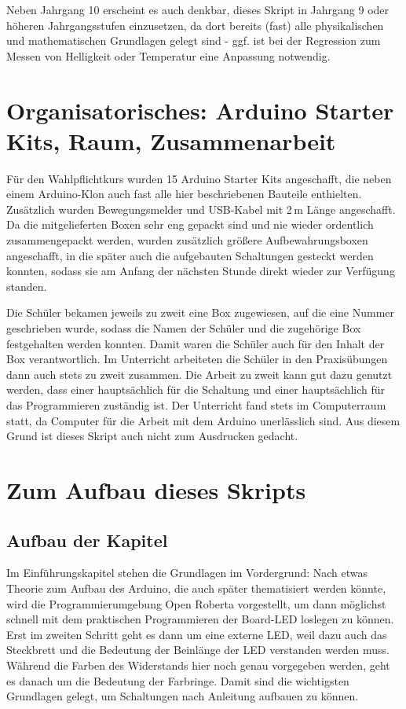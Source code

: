 Neben Jahrgang 10 erscheint es auch denkbar, dieses Skript in Jahrgang 9 oder höheren Jahrgangsstufen einzusetzen, da dort bereits (fast) alle physikalischen und mathematischen Grundlagen gelegt sind - ggf. ist bei der Regression zum Messen von Helligkeit oder Temperatur eine Anpassung notwendig.

\section{Organisatorisches: Arduino Starter Kits, Raum, Zusammenarbeit}

Für den Wahlpflichtkurs wurden 15 Arduino Starter Kits angeschafft, die neben einem Arduino-Klon auch fast alle hier beschriebenen Bauteile enthielten. Zusätzlich wurden Bewegungsmelder und USB-Kabel mit 2\,m Länge angeschafft. Da die mitgelieferten Boxen sehr eng gepackt sind und nie wieder ordentlich zusammengepackt werden, wurden zusätzlich größere Aufbewahrungsboxen angeschafft, in die später auch die aufgebauten Schaltungen gesteckt werden konnten, sodass sie am Anfang der nächsten Stunde direkt wieder zur Verfügung standen.

Die Schüler bekamen jeweils zu zweit eine Box zugewiesen, auf die eine Nummer geschrieben wurde, sodass die Namen der Schüler und die zugehörige Box festgehalten werden konnten. Damit waren die Schüler auch für den Inhalt der Box verantwortlich. Im Unterricht arbeiteten die Schüler in den Praxisübungen dann auch stets zu zweit zusammen. Die Arbeit zu zweit kann gut dazu genutzt werden, dass einer hauptsächlich für die Schaltung und einer hauptsächlich für das Programmieren zuständig ist. Der Unterricht fand stets im Computerraum statt, da Computer für die Arbeit mit dem Arduino unerlässlich sind. Aus diesem Grund ist dieses Skript auch nicht zum Ausdrucken gedacht.

\section{Zum Aufbau dieses Skripts}

\subsection{Aufbau der Kapitel}

Im Einführungskapitel stehen die Grundlagen im Vordergrund: Nach etwas Theorie zum Aufbau des Arduino, die auch später thematisiert werden könnte, wird die Programmierumgebung Open Roberta vorgestellt, um dann möglichst schnell mit dem praktischen Programmieren der Board-LED loslegen zu können. Erst im zweiten Schritt geht es dann um eine externe LED, weil dazu auch das Steckbrett und die Bedeutung der Beinlänge der LED verstanden werden muss. Während die Farben des Widerstands hier noch genau vorgegeben werden, geht es danach um die Bedeutung der Farbringe. Damit sind die wichtigsten Grundlagen gelegt, um Schaltungen nach Anleitung aufbauen zu können.

